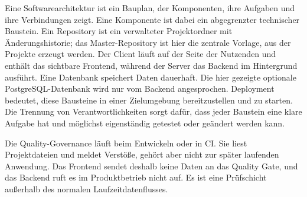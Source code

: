 \begin{beginnerstatement}

Eine Softwarearchitektur ist ein Bauplan, der Komponenten, ihre Aufgaben und
ihre Verbindungen zeigt. Eine Komponente ist dabei ein abgegrenzter technischer
Baustein. Ein Repository ist ein verwalteter Projektordner mit
Änderungshistorie; das Master-Repository ist hier die zentrale Vorlage, aus der
Projekte erzeugt werden. Der Client läuft auf der Seite der Nutzenden und enthält das sichtbare
Frontend, während der Server das Backend im Hintergrund ausführt. Eine
Datenbank speichert Daten dauerhaft. Die hier gezeigte optionale
PostgreSQL-Datenbank wird nur vom Backend angesprochen. Deployment bedeutet,
diese Bausteine in einer
Zielumgebung bereitzustellen und zu starten. Die Trennung von
Verantwortlichkeiten sorgt dafür, dass jeder Baustein eine klare Aufgabe hat
und möglichst eigenständig getestet oder geändert werden kann.

Die Quality-Governance läuft beim Entwickeln oder in CI. Sie liest
Projektdateien und meldet Verstöße, gehört aber nicht zur später laufenden
Anwendung. Das Frontend sendet deshalb keine Daten an das Quality Gate, und das
Backend ruft es im Produktbetrieb nicht auf. Es ist eine Prüfschicht außerhalb
des normalen Laufzeitdatenflusses.

\end{beginnerstatement}
